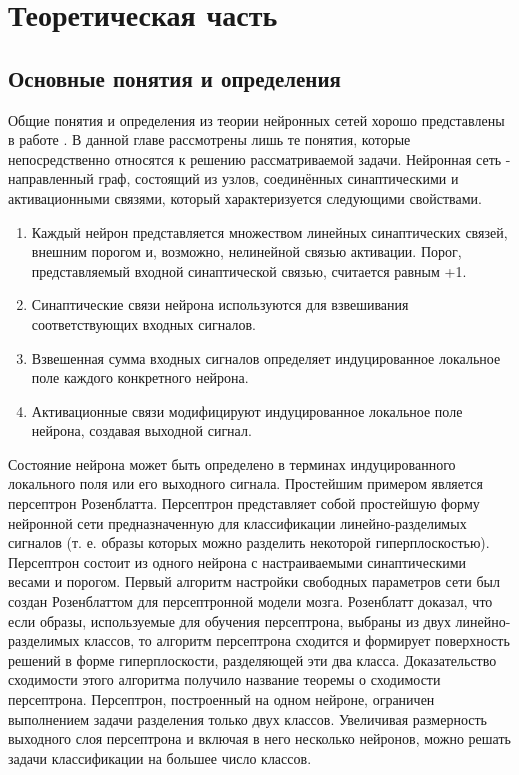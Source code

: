 \documentclass[oneside,final,14pt]{extreport}
\begin{document}
\chapter{Теоретическая часть}
\section{Основные понятия и определения}
Общие понятия и определения из теории нейронных сетей хорошо представлены в работе \cite{hykin:nn}. В данной главе рассмотрены лишь те понятия, которые непосредственно относятся к решению рассматриваемой задачи.
Нейронная сеть - направленный граф, состоящий из узлов, соединённых синаптическими и активационными связями, который характеризуется следующими свойствами.
\begin{enumerate}
    \item Каждый нейрон представляется множеством линейных синаптических связей, внешним порогом и, возможно, нелинейной связью активации. Порог, представляемый входной синаптической связью, считается равным +1.
    \item Синаптические связи нейрона используются для взвешивания соответствующих входных сигналов.
    \item Взвешенная сумма входных сигналов определяет индуцированное локальное поле каждого конкретного нейрона.
    \item Активационные связи модифицируют индуцированное локальное поле нейрона, создавая выходной сигнал.
\end{enumerate}
Состояние нейрона может быть определено в терминах индуцированного локального поля или его выходного сигнала.
Простейшим примером является персептрон Розенблатта.
Персептрон представляет собой простейшую форму нейронной сети предназначенную для классификации линейно-разделимых сигналов (т. е. образы которых можно разделить некоторой гиперплоскостью). Персептрон состоит из одного нейрона с настраиваемыми синаптическими весами и порогом. Первый алгоритм настройки свободных параметров сети был создан Розенблаттом для персептронной модели мозга. Розенблатт доказал, что если образы, используемые для обучения персептрона, выбраны из двух линейно-разделимых классов, то алгоритм персептрона сходится и формирует поверхность решений в форме гиперплоскости, разделяющей эти два класса. Доказательство сходимости этого алгоритма получило название теоремы о сходимости персептрона. Персептрон, построенный на одном нейроне, ограничен выполнением задачи разделения только двух классов. Увеличивая размерность выходного слоя персептрона и включая в него несколько нейронов, можно решать задачи классификации на большее число классов.
\end{document}
